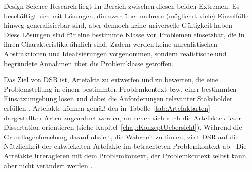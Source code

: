 Design Science Research liegt im Bereich zwischen diesen beiden Extremen. Es beschäftigt sich mit Lösungen, die zwar über mehrere (möglichst viele) Einzelfälle hinweg generalisierbar sind, aber dennoch keine universelle Gültigkeit haben. Diese Lösungen sind für eine bestimmte Klasse von Problemen einsetzbar, die in ihren Charakteristika ähnlich sind. Zudem werden keine unrealistischen Abstraktionen und Idealisierungen vorgenommen, sondern realistische und begründete Annahmen über die Problemklasse getroffen. \cite{Wieringa.2014}

Das Ziel von DSR ist, Artefakte zu entwerfen und zu bewerten, die eine Problemstellung in einem bestimmten Problemkontext bzw. einer bestimmten Einsatzumgebung lösen und dabei die Anforderungen relevanter Stakeholder erfüllen \cite{Wieringa.2014}. Artefakte können gemäß \cite{Dresch.2015} den in Tabelle~\ref{tab:Artefaktarten} dargestellten Arten zugeordnet werden, an denen sich auch die Artefakte dieser Dissertation orientieren (siehe Kapitel~\ref{chap:KonzeptUebersicht}). Während die Grundlagenforschung darauf abzielt, die Wahrheit zu finden, zielt DSR auf die Nützlichkeit der entwickelten Artefakte im betrachteten Problemkontext ab \cite{deSordi.2021}. Die Artefakte interagieren mit dem Problemkontext, der Problemkontext selbst kann aber nicht verändert werden \cite{Wieringa.2014}.

